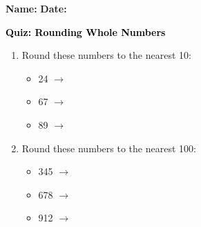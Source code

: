 \documentclass[12pt, letterpaper, fleqn]{article}
\newcommand{\blank}{\underline{\hspace{2.2cm}}}
\begin{document}
\textbf{Name:} \underline{\hspace{5cm}}
\hfill
\textbf{Date:} \underline{\hspace{3cm}}\\

\begin{tcolorbox}[colback=customteal!20]
    \large\textcolor{black}{\textbf{Quiz: Rounding Whole Numbers}}
\end{tcolorbox}

\vspace{5mm}
\begin{enumerate}[itemsep=2.5cm, leftmargin=0.6cm]
\item Round these numbers to the nearest 10:
\begin{itemize}[itemsep=0.8cm]
  \item 24 $\rightarrow$ \blank
  \item 67 $\rightarrow$ \blank
  \item 89 $\rightarrow$ \blank
\end{itemize}

\item Round these numbers to the nearest 100:
\begin{itemize}[itemsep=0.8cm]
  \item 345 $\rightarrow$ \blank
  \item 678 $\rightarrow$ \blank
  \item 912 $\rightarrow$ \blank
\end{itemize}
\end{enumerate}
\end{document}
